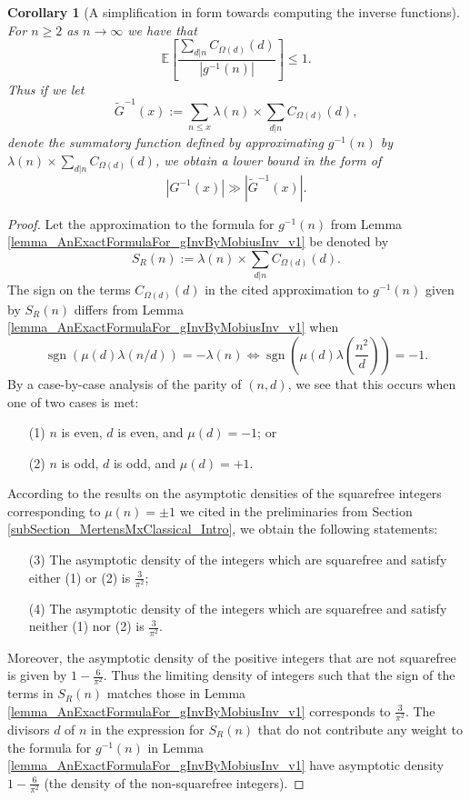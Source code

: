 \documentclass[11pt,reqno,a4letter]{article}
\numberwithin{figure}{section}
\numberwithin{table}{section}
\theoremstyle{plain}
\newtheorem{cor}[theorem]{Corollary}
\numberwithin{theorem}{section}
\theoremstyle{definition}
\begin{document}
\begin{cor}[A simplification in form towards computing the inverse functions] 
\label{cor_ComputingInvFuncs_InPractice_DivSumgInvAst1_v1} 
For $n \geq 2$ as $n \rightarrow \infty$ we have that 
\[
\mathbb{E}\left[\frac{\sum\limits_{d|n} C_{\Omega(d)}(d)}{|g^{-1}(n)|}\right] \leq 1. 
\]
Thus if we let 
\[
\widetilde{G}^{-1}(x) := \sum_{n \leq x} \lambda(n) \times \sum_{d|n} C_{\Omega(d)}(d), 
\]
denote the summatory function defined by approximating $g^{-1}(n)$ by 
$\lambda(n) \times \sum_{d|n} C_{\Omega(d)}(d)$, we obtain a lower bound in the form of 
$$|G^{-1}(x)| \gg \left\lvert \widetilde{G}^{-1}(x) \right\rvert.$$
\end{cor} 
\begin{proof} 
Let the approximation to the formula for $g^{-1}(n)$ from 
Lemma \ref{lemma_AnExactFormulaFor_gInvByMobiusInv_v1} be denoted by 
\[
S_R(n) := \lambda(n) \times \sum_{d|n} C_{\Omega(d)}(d). 
\]
The sign on the terms $C_{\Omega(d)}(d)$ in the cited approximation to $g^{-1}(n)$ 
given by $S_R(n)$ differs from Lemma \ref{lemma_AnExactFormulaFor_gInvByMobiusInv_v1} when 
\[
\operatorname{sgn}\left(\mu(d) \lambda(n/d)\right) = -\lambda(n) \iff 
     \operatorname{sgn}\left(\mu(d) \lambda\left(\frac{n^2}{d}\right)\right) = -1. 
\]
By a case-by-case analysis of the parity of $(n, d)$, we see that this occurs when one of two 
cases is met: 
\begin{itemize} 
\item[(1)] $n$ is even, $d$ is even, and $\mu(d) = -1$; or 
\item[(2)] $n$ is odd, $d$ is odd, and $\mu(d) = +1$. 
\end{itemize} 
According to the results on the asymptotic densities of the squarefree integers corresponding to 
$\mu(n) = \pm 1$ we cited in the preliminaries from Section \ref{subSection_MertensMxClassical_Intro}, 
we obtain the following statements: 
\begin{itemize} 
\item[(3)] The asymptotic density of the integers which are squarefree and satisfy either (1) or (2) is $\frac{3}{\pi^2}$; 
\item[(4)] The asymptotic density of the integers which are squarefree and satisfy neither (1) nor (2) is $\frac{3}{\pi^2}$. 
\end{itemize} 
Moreover, the asymptotic density of the positive integers that are not squarefree is given by 
$1 - \frac{6}{\pi^2}$. Thus the limiting density of integers such that the sign of the terms in 
$S_R(n)$ matches those in Lemma \ref{lemma_AnExactFormulaFor_gInvByMobiusInv_v1} corresponds to 
$\frac{3}{\pi^2}$. The divisors $d$ of $n$ in the expression for $S_R(n)$ that do not contribute 
any weight to the formula for $g^{-1}(n)$ in 
Lemma \ref{lemma_AnExactFormulaFor_gInvByMobiusInv_v1} have 
asymptotic density $1 - \frac{6}{\pi^2}$ (the density of the non-squarefree integers). 


\end{proof}
\end{document}
